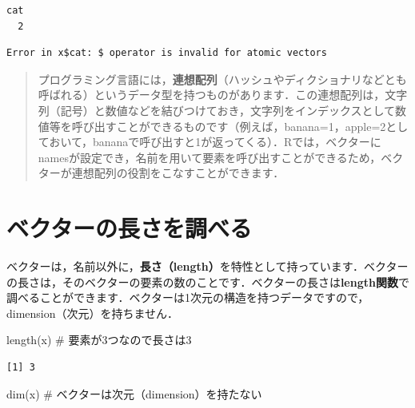 \documentclass[
  letterpaper,
  DIV=11,
  numbers=noendperiod]{scrreprt}
\newenvironment{Shaded}{\begin{snugshade}}{\end{snugshade}}
\newcommand{\CommentTok}[1]{\textcolor[rgb]{0.37,0.37,0.37}{#1}}
\newcommand{\FunctionTok}[1]{\textcolor[rgb]{0.28,0.35,0.67}{#1}}
\newcommand{\NormalTok}[1]{\textcolor[rgb]{0.00,0.23,0.31}{#1}}
\newcommand{\SpecialCharTok}[1]{\textcolor[rgb]{0.37,0.37,0.37}{#1}}
\begin{document}
\begin{verbatim}
cat 
  2 
\end{verbatim}

\begin{Shaded}
\end{Shaded}

\begin{verbatim}
Error in x$cat: $ operator is invalid for atomic vectors
\end{verbatim}

\begin{quote}
プログラミング言語には，\textbf{連想配列}（ハッシュやディクショナリなどとも呼ばれる）というデータ型を持つものがあります．この連想配列は，文字列（記号）と数値などを結びつけておき，文字列をインデックスとして数値等を呼び出すことができるものです（例えば，banana=1，apple=2としておいて，bananaで呼び出すと1が返ってくる）．Rでは，ベクターにnamesが設定でき，名前を用いて要素を呼び出すことができるため，ベクターが連想配列の役割をこなすことができます．
\end{quote}

\hypertarget{ux30d9ux30afux30bfux30fcux306eux9577ux3055ux3092ux8abfux3079ux308b}{%
\section{ベクターの長さを調べる}\label{ux30d9ux30afux30bfux30fcux306eux9577ux3055ux3092ux8abfux3079ux308b}}

ベクターは，名前以外に，\textbf{長さ（length）}を特性として持っています．ベクターの長さは，そのベクターの要素の数のことです．ベクターの長さは\textbf{length関数}で調べることができます．ベクターは1次元の構造を持つデータですので，dimension（次元）を持ちません．

\begin{Shaded}
\begin{Highlighting}[]
\FunctionTok{length}\NormalTok{(x) }\CommentTok{\# 要素が3つなので長さは3}
\end{Highlighting}
\end{Shaded}

\begin{verbatim}
[1] 3
\end{verbatim}

\begin{Shaded}
\begin{Highlighting}[]
\FunctionTok{dim}\NormalTok{(x) }\CommentTok{\# ベクターは次元（dimension）を持たない}
\end{Highlighting}
\end{Shaded}
\end{document}
